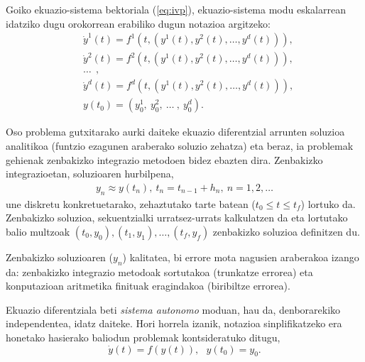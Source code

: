 Goiko ekuazio-sistema bektoriala (\ref{eq:ivp}), ekuazio-sistema modu eskalarrean idatziko dugu orokorrean erabiliko dugun notazioa argitzeko:
\begin{align*}
&\dot{y}^1(t)=f^1(t,(y^1(t),y^2(t),\ldots,y^d(t))), \\
&\dot{y}^2(t)=f^2(t,(y^1(t),y^2(t),\ldots,y^d(t))), \\
&\ldots\ \ ,\\
&\dot{y}^d(t)=f^d(t,(y^1(t),y^2(t),\ldots,y^d(t))),  \\
& y(t_0)=(y_{0}^1,\ y_{0}^2,\ \ldots \ , \ y_{0}^d).
\end{align*}


Oso problema gutxitarako aurki daiteke ekuazio diferentzial arrunten soluzioa analitikoa (funtzio ezagunen araberako soluzio zehatza) eta beraz, ia problemak gehienak zenbakizko integrazio metodoen bidez ebazten dira.
Zenbakizko integrazioetan, soluzioaren hurbilpena,
\begin{align*}
 y_n \approx y(t_n), \ t_n=t_{n-1}+h_n, \ n=1,2,\dots
\end{align*}
une diskretu konkretuetarako, zehaztutako tarte batean ($t_0\le t \le t_f$) lortuko da. Zenbakizko soluzioa, sekuentzialki urratsez-urrats kalkulatzen da eta lortutako balio  multzoak $(t_0,y_0),(t_1,y_1),\dots,(t_f,y_f)$ zenbakizko soluzioa definitzen du.   

Zenbakizko soluzioaren ($y_n$) kalitatea, bi errore mota nagusien araberakoa izango da: zenbakizko integrazio metodoak sortutakoa (trunkatze errorea) eta konputazioan aritmetika finituak eragindakoa (biribiltze errorea). 

Ekuazio diferentziala beti \emph{sistema autonomo} moduan, hau da, denborarekiko independentea, idatz daiteke. Hori horrela izanik, notazioa sinplifikatzeko era honetako hasierako baliodun problemak kontsideratuko ditugu,   
\begin{equation}
\label{eq:autonomo}
\dot{y}(t)=f(y(t)),\ \ \ y(t_0)=y_0.
\end{equation}


